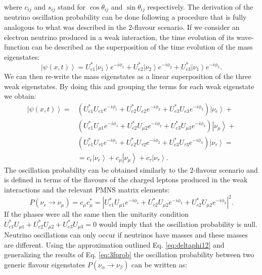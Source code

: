 where $c_{ij}$ and $s_{ij}$ stand for $\cos\theta_{ij}$ and $\sin\theta_{ij}$ respectively. The derivation of the neutrino oscillation probability can be done following a procedure that is fully analogous to what was described in the 2-flavour scenario. If we consider an electron neutrino produced in a weak interaction, the time evolution of its wave-function can be described as the superposition of the time evolution of the mass eigenstates:
\begin{equation}
    \left|\psi(x,t)\right\rangle = U_{e1}^*\left|\nu_1\right\rangle e^{-i\phi_1}+
    U_{e2}^*\left|\nu_2\right\rangle e^{-i\phi_2}+
    U_{e3}^*\left|\nu_1\right\rangle e^{-i\phi_3} .
\end{equation}
We can then re-write the mass eigenstates as a linear superposition of the three weak eigenstates. By doing this and grouping the terms for each weak eigenstate we obtain:
\begin{equation}
    \begin{aligned}
        \left|\psi(x,t)\right\rangle =&
        (U^*_{e1}U_{e1}e^{-i\phi_1}+
         U^*_{e2}U_{e2}e^{-i\phi_2}+
         U^*_{e3}U_{e3}e^{-i\phi_3})
         \left|\nu_e\right\rangle
        + \\ &
        (U^*_{e1}U_{\mu1}e^{-i\phi_1}+
         U^*_{e2}U_{\mu2}e^{-i\phi_2}+
         U^*_{e3}U_{\mu3}e^{-i\phi_3})
         \left|\nu_\mu\right\rangle
        + \\ &
        (U^*_{e1}U_{\tau1}e^{-i\phi_1}+
         U^*_{e2}U_{\tau2}e^{-i\phi_2}+
         U^*_{e3}U_{\tau3}e^{-i\phi_3})
         \left|\nu_\tau\right\rangle =
        \\ &
        =c_e \left|\nu_e\right\rangle+
        c_\mu\left|\nu_\mu\right\rangle+
        c_\tau\left|\nu_\tau\right\rangle .
    \end{aligned}
\end{equation}
The oscillation probability can be obtained similarly to the 2-flavour scenario and is defined in terms of the flavours of the charged leptons produced in the weak interactions and the relevant PMNS matrix elements:
\begin{equation}
\label{eq:3fprob}
    P(\nu_e\rightarrow\nu_\mu) = c_\mu c_\mu^* = |U_{e1}^*U_{\mu1}e^{-i\phi_1}+U_{e2}^*U_{\mu2}e^{-i\phi_2}+U_{e2}^*U_{\mu2}e^{-i\phi_2}|^2 .
\end{equation}
If the phases were all the same then the unitarity condition $U_{e1}^*U_{\mu1}+U_{e2}^*U_{\mu2}+U_{e3}^*U_{\mu3}=0$ would imply that the oscillation probability is null. Neutrino oscillations can only occur if neutrinos have masses and these masses are different. Using the approximation outlined Eq. \ref{eq:deltaphi12} and generalizing the results of Eq. \ref{eq:3fprob} the oscillation probability between two generic flavour eigenstates $P(\nu_\alpha\rightarrow\nu_\beta)$ can be written as:
